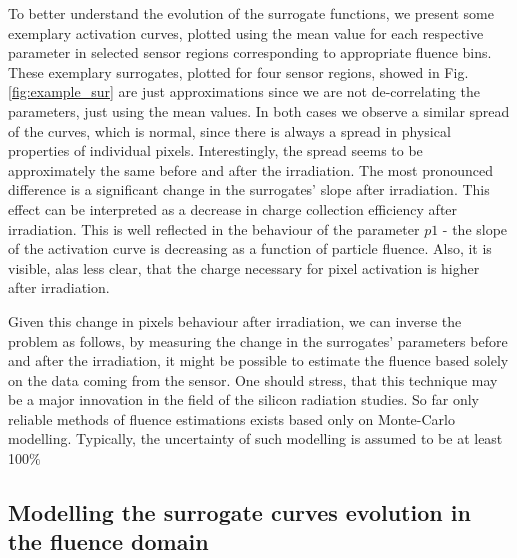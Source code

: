 To better understand the evolution of the surrogate functions, we present some exemplary activation curves, plotted using the mean value for each respective parameter in selected sensor regions corresponding to appropriate fluence bins.
These exemplary surrogates, plotted for four sensor regions, showed in Fig. \ref{fig:example_sur} are just approximations since we are not de-correlating the parameters, just using the mean values.
In both cases we observe a similar spread of the curves, which is normal, since there is always a spread in physical properties of individual pixels. Interestingly, the spread seems to be approximately the same before and after the irradiation. The most pronounced difference is a significant change in the surrogates' slope after irradiation. This effect can be interpreted as a decrease in charge collection efficiency after irradiation. This is well reflected in the behaviour of the parameter $p1$ - the slope of the activation curve is decreasing as a function of particle fluence. Also, it is visible, alas less clear, that the charge necessary for pixel activation is higher after irradiation. 

Given this change in pixels behaviour after irradiation, we can inverse the problem as follows, by measuring the change in the surrogates' parameters before and after the irradiation, it might be possible to estimate the fluence based solely on the data coming from the sensor. One should stress, that this technique may be a major innovation in the field of the silicon radiation studies. So far only reliable methods of fluence estimations exists based only on Monte-Carlo modelling. Typically, the uncertainty of such modelling is assumed to be at least 100$\%$

\subsection{Modelling the surrogate curves evolution in the fluence domain}

